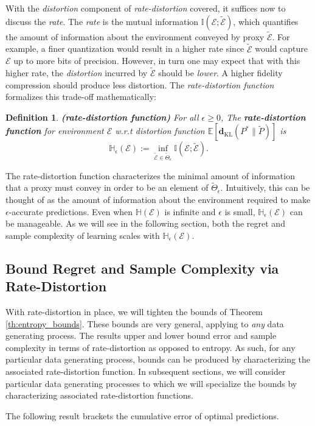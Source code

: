 \documentclass[twoside,11pt]{article}
\newtheorem{definition}[theorem]{Definition}
\def\environment{\mathcal{E}}
\def\proxy{\tilde{\environment}}
\def\proxyset{\tilde{\Theta}}
\def\KL{\mathbf{d}_{\mathrm{KL}}}
\def\E{\mathbb{E}}
\def\H{\mathbb{H}}
\def\I{\mathbb{I}}
\begin{document}
With the \emph{distortion} component of \emph{rate-distortion} covered, it suffices now to discuss the \emph{rate}. The \emph{rate} is the mutual information $\I(\environment; \proxy)$, which quantifies the amount of information about the environment conveyed by proxy $\proxy$.  For example, a finer quantization would result in a higher rate since $\proxy$ would capture $\environment$ up to more bits of precision. However, in turn one may expect that with this higher rate, the \emph{distortion} incurred by $\proxy$ should be \emph{lower}. A higher fidelity compression should produce less distortion. The \emph{rate-distortion function} formalizes this trade-off mathematically:
\begin{definition}{\bf (rate-distortion function)}
    For all $\epsilon\geq0$, The \textbf{rate-distortion function} for environment $\environment$ w.r.t distortion function $\E[\KL(P^*\|\tilde{P})]$ is
    $$\H_\epsilon(\environment) := \inf_{\proxy \in \proxyset_\epsilon} \I(\environment; \proxy).$$
\end{definition}
The rate-distortion function characterizes the minimal amount of information that a proxy must convey in order to be an element of $\proxyset_\epsilon$.  Intuitively, this can be thought of as the amount of information about the environment required to make $\epsilon$-accurate predictions.  Even when $\H(\environment)$ is infinite and $\epsilon$ is small, $\H_\epsilon(\environment)$ can be manageable.  As we will see in the following section, both the regret and sample complexity of learning scales with $\H_\epsilon(\environment)$.
\subsection{Bound Regret and Sample Complexity via Rate-Distortion}
With rate-distortion in place, we will tighten the bounds of Theorem \ref{th:entropy_bounds}.  These bounds are very general, applying to {\it any} data generating process.  The results upper and lower bound error and sample complexity in terms of rate-distortion as opposed to entropy.  As such, for any particular data generating process, bounds can be produced by characterizing the associated rate-distortion function.  In subsequent sections, we will consider particular data generating processes to which we will specialize the bounds by characterizing associated rate-distortion functions.

The following result brackets the cumulative error of optimal predictions.
\end{document}
